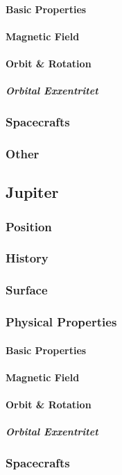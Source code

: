 \paragraph{Basic Properties}
\paragraph{Magnetic Field}
\paragraph{Orbit \& Rotation}
\subparagraph{Orbital Exxentritet}
\subsubsection{Spacecrafts}
\subsubsection{Other}

\subsection{Jupiter}
\subsubsection{Position}
\subsubsection{History}
\subsubsection{Surface}
\subsubsection{Physical Properties}
\paragraph{Basic Properties}
\paragraph{Magnetic Field}
\paragraph{Orbit \& Rotation}
\subparagraph{Orbital Exxentritet}
\subsubsection{Spacecrafts}
